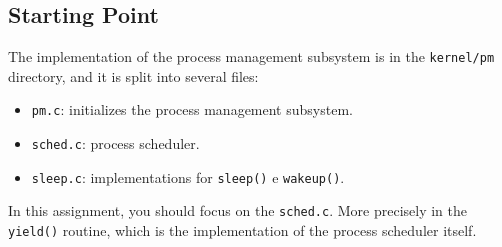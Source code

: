 \documentclass[11pt]{article}
\newif\ifbr
\newif\ifen
\begin{document}
\fi\fi

\ifbr
	\subsubsection*{Por Onde Começar?}

		O código do gerenciador de processos do Nanvix está no diretório
		\texttt{kernel/pm}, dividido em vários arquivos, dentre eles:

		\begin{itemize}
			\item \texttt{pm.c}: inicialização do gerenciador de processos.
			\item \texttt{sched.c}: escalonamento de processos.
			\item \texttt{sleep.c}: implementação das funções utilitárias \texttt{sleep()} e \texttt{wakeup()}.
		\end{itemize}

		Nesse projeto, você deve se atentar ao arquivo \texttt{sched.c},
		principalmente na função \texttt{yield()}, que implementa a função
		de escalonamento.
\else\ifen
	\subsection*{Starting Point}
	
		The implementation of the process management subsystem is in the
		\texttt{kernel/pm} directory, and it is split into several
		files:
		\begin{itemize}
			\item \texttt{pm.c}: initializes the process management subsystem.
			\item \texttt{sched.c}: process scheduler.
			\item \texttt{sleep.c}: implementations for  \texttt{sleep()} e \texttt{wakeup()}.
		\end{itemize}

		In this assignment, you should focus on the \texttt{sched.c}.
		More precisely in the \texttt{yield()} routine, which is the
		implementation of the process scheduler itself.
\fi\fi
\end{document}
